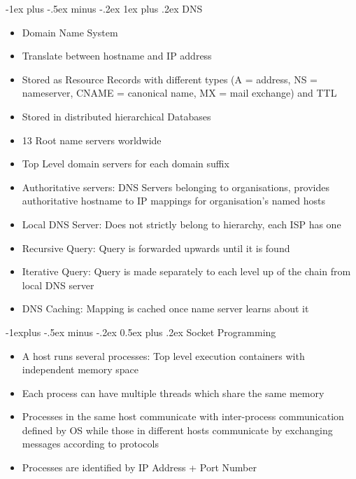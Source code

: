 \documentclass[10pt, landscape]{article}
\makeatletter
\renewcommand{\section}{\@startsection{section}{1}{0mm}%
                                {-1ex plus -.5ex minus -.2ex}%
                                {0.5ex plus .2ex}%
                                {\normalfont\large\bfseries}}
\renewcommand{\section}{\@startsection{section}{2}{0mm}%
                                {-1explus -.5ex minus -.2ex}%
                                {0.5ex plus .2ex}%
                                {\normalfont\normalsize\bfseries}}
\renewcommand{\subsection}{\@startsection{subsection}{3}{0mm}%
                                {-1ex plus -.5ex minus -.2ex}%
                                {1ex plus .2ex}%
                                {\normalfont\small\bfseries}}%
\makeatother
\begin{document}
\begin{multicols*}{3}
\subsection{DNS}
\begin{itemize}
    \item Domain Name System
    \item Translate between hostname and IP address
    \item Stored as Resource Records with different types (A = address, NS = nameserver, CNAME = canonical name, MX = mail exchange) and TTL
    \item Stored in distributed hierarchical Databases
    \item 13 Root name servers worldwide
    \item Top Level domain servers for each domain suffix
    \item Authoritative servers: DNS Servers belonging to organisations, provides authoritative hostname to IP mappings for organisation's named hosts
    \item Local DNS Server: Does not strictly belong to hierarchy, each ISP has one
    \item Recursive Query: Query is forwarded upwards until it is found
    \item Iterative Query: Query is made separately to each level up of the chain from local DNS server
    \item DNS Caching: Mapping is cached once name server learns about it
\end{itemize}

\section{Socket Programming}
\begin{itemize}
    \item A host runs several processes: Top level execution containers with independent memory space
    \item Each process can have multiple threads which share the same memory
    \item Processes in the same host communicate with inter-process communication defined by OS while those in different hosts communicate by exchanging messages according to protocols
    \item Processes are identified by IP Address + Port Number
\end{itemize}


\end{multicols*}
\end{document}
